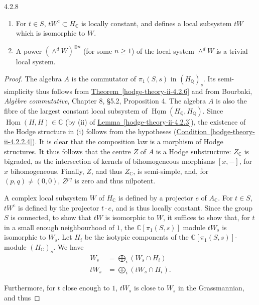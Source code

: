 \begin{corollary}{4.2.8}
\begin{enumerate}
\begin{enumerate}
 \item[(a)]
          For \(t\in  S\), \(tW^\mathrm {c}\subset  H_\mathbb {C}\) is locally constant, and defines a local subsystem \(tW\) which is isomorphic to \(W\).
        


        
 \item[(b)]
          A power \((\wedge ^d W)^{\otimes  n}\) (for some \(n\geqslant 1\)) of the local system \(\wedge ^d W\) is a trivial local system.
        

      \end{enumerate}

    

  \end{enumerate}\begin{proof}\par{}The algebra \(A\) is the commutator of \(\pi _1(S,s)\) in \((H_\mathbb {Q})_s\).
      Its semi-simplicity thus follows from \hyperref[hodge-theory-ii-4.2.6]{Theorem~\ref*{hodge-theory-ii-4.2.6}} and from Bourbaki, \emph{Algèbre commutative}, Chapter 8, §5.2, Proposition 4.
      The algebra \(A\) is also the fibre of the largest constant local subsystem of \(\underline {\operatorname {Hom}}(H_\mathbb {Q},H_\mathbb {Q})\).
      Since \(\underline {\operatorname {Hom}}(H,H)\in \mathbb {C}\) (by (ii) of \hyperref[hodge-theory-ii-4.2.3]{Lemma~\ref*{hodge-theory-ii-4.2.3}}), the existence of the Hodge structure in (i) follows from the hypotheses (\hyperref[hodge-theory-ii-4.2.2.4]{Condition~\ref*{hodge-theory-ii-4.2.2.4}}).
      It is clear that the composition law is a morphism of Hodge structures.
      It thus follows that the centre \(Z\) of \(A\) is a Hodge substructure: \(Z_\mathbb {C}\) is bigraded, as the intersection of kernels of bihomogeneous morphisms \([x,-]\), for \(x\) bihomogeneous.
      Finally, \(Z\), and thus \(Z_\mathbb {C}\), is semi-simple, and, for \((p,q)\neq (0,0)\), \(Z^{pq}\) is zero and thus nilpotent.\par{}A complex local subsystem \(W\) of \(H_\mathbb {C}\) is defined by a projector \(e\) of \(A_\mathbb {C}\).
      For \(t\in  S\), \(tW^\mathrm {c}\) is defined by the projector \(t\cdot  e\), and is thus locally constant.
      Since the group \(S\) is connected, to show that \(tW\) is isomorphic to \(W\), it suffices to show that, for \(t\) in a small enough neighbourhood of \(1\), the \(\mathbb {C}[\pi _1(S,s)]\) module \(tW_s\) is isomorphic to \(W_s\).
      Let \(H_i\) be the isotypic components of the \(\mathbb {C}[\pi _1(S,s)]\)-module \((H_\mathbb {C})_s\).
      We have
      \[         \begin {aligned}           W_s           &= \bigoplus _i(W_s\cap  H_i)         \\tW_s           &= \bigoplus _i(tW_s\cap  H_i).         \end {aligned}       \]\par{}Furthermore, for \(t\) close enough to \(1\), \(tW_s\) is close to \(W_s\) in the Grassmannian, and thus


\end{proof}
\end{corollary}
